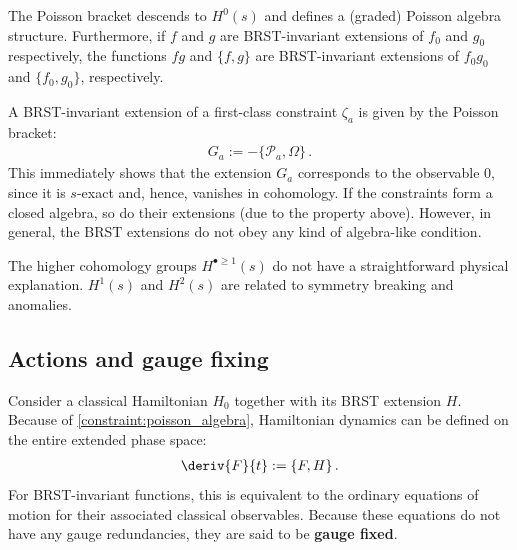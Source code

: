     \begin{property}\label{constraint:poisson_algebra}
        The Poisson bracket descends to $H^0(s)$ and defines a (graded) Poisson algebra structure. Furthermore, if $f$ and $g$ are BRST-invariant extensions of $f_0$ and $g_0$ respectively, the functions $fg$ and $\{f,g\}$ are BRST-invariant extensions of $f_0g_0$ and $\{f_0,g_0\}$, respectively.
    \end{property}

    \begin{example}
        A BRST-invariant extension of a first-class constraint $\zeta_a$ is given by the Poisson bracket:
        \begin{gather}
            G_a := -\{\mathcal{P}_a,\Omega\}\,.
        \end{gather}
        This immediately shows that the extension $G_a$ corresponds to the observable 0, since it is $s$-exact and, hence, vanishes in cohomology. If the constraints form a closed algebra, so do their extensions (due to the property above). However, in general, the BRST extensions do not obey any kind of algebra-like condition.
    \end{example}

    \begin{remark}
        The higher cohomology groups $H^{\bullet\geq1}(s)$ do not have a straightforward physical explanation. $H^1(s)$ and $H^2(s)$ are related to symmetry breaking and anomalies.
    \end{remark}

\subsection{Actions and gauge fixing}

    Consider a classical Hamiltonian $H_0$ together with its BRST extension $H$. Because of \cref{constraint:poisson_algebra}, Hamiltonian dynamics can be defined on the entire extended phase space:
    \begin{gather}
        \deriv{F}{t} := \{F,H\}\,.
    \end{gather}
    For BRST-invariant functions, this is equivalent to the ordinary equations of motion for their associated classical observables. Because these equations do not have any gauge redundancies, they are said to be \textbf{gauge fixed}.

